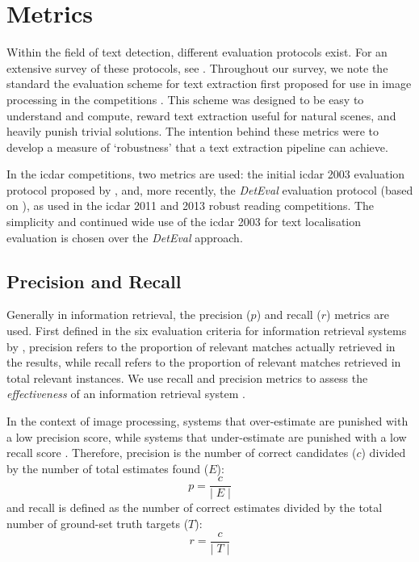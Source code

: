 \section{Metrics}
\label{sec:background:metrics}

Within the field of text detection, different evaluation protocols exist. For an extensive survey of these protocols, see \citep{Wolf:2006gv,Ye:2014bs}. Throughout our survey, we note the standard the evaluation scheme for text extraction first proposed for use in image processing in the  competitions \citep{Lucas:2003iw, Lucas:2005bq, Shahab:2011hq, Karatzas:2013by, Karatzas:2015tj}. This scheme was designed to be easy to understand and compute, reward text extraction useful for natural scenes, and heavily punish trivial solutions. The intention behind these metrics were to develop a measure of `robustness' that a text extraction pipeline can achieve. 

In the \gls{icdar} competitions, two metrics are used: the initial \gls{icdar} 2003 evaluation protocol proposed by \citet{Lucas:2003iw}, and, more recently, the \textit{DetEval} evaluation protocol \citep{Shivakumara:2011dn} (based on \citep{Wolf:2006gv}), as used in the \gls{icdar} 2011 and 2013 robust reading competitions. The simplicity and continued wide use of the \gls{icdar} 2003 for text localisation evaluation is chosen over the \textit{DetEval} approach.

\subsection{Precision and Recall}
\label{sec:background:metrics:precision_and_recall}

Generally in information retrieval, the precision ($p$) and recall ($r$) metrics are used. First defined in the six evaluation criteria for information retrieval systems by \citet{Cleverdon:1966vd}, precision refers to the proportion of relevant matches actually retrieved in the results, while recall refers to the proportion of relevant matches retrieved in total relevant instances. We use recall and precision metrics to assess the \textit{effectiveness} of an information retrieval system \citep{Rijsbergen:1979dw}.

In the context of image processing, systems that over-estimate are punished with a low precision score, while systems that under-estimate are punished with a low recall score \citep{Lucas:2003iw}. Therefore, precision is the number of correct candidates ($c$) divided by the number of total estimates found ($E$):
\begin{equation*}
  p = \frac{c}{\lvert\;E\;\rvert}
\end{equation*}
and recall is defined as the number of correct estimates divided by the total number of ground-set truth targets ($T$):
\begin{equation*}
  r = \frac{c}{\lvert\;T\;\rvert}
\end{equation*}

